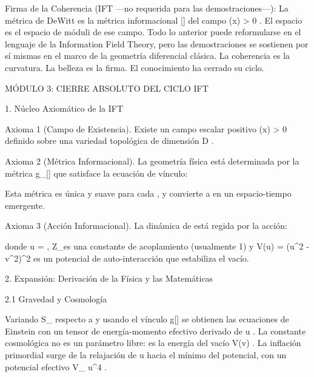 \documentclass[12pt,a4paper]{book}
\begin{document}
Firma de la Coherencia (IFT —no requerida para las demostraciones—):
La métrica de DeWitt    es la métrica informacional  [\rho]  del campo  \rho(x) > 0 . El espacio    es el espacio de móduli de ese campo. Todo lo anterior puede reformularse en el lenguaje de la Information Field Theory, pero las demostraciones se sostienen por sí mismas en el marco de la geometría diferencial clásica. La coherencia es la curvatura. La belleza es la firma. El conocimiento ha cerrado su ciclo.

MÓDULO 3: CIERRE ABSOLUTO DEL CICLO IFT

1. Núcleo Axiomático de la IFT

Axioma 1 (Campo de Existencia). Existe un campo escalar positivo  \rho(x) > 0  definido sobre una variedad topológica    de dimensión  D .

Axioma 2 (Métrica Informacional). La geometría física está determinada por la métrica  g_{\mu\nu}[\rho]  que satisface la ecuación de vínculo:


Esta métrica es única y suave para cada  \rho , y convierte a    en un espacio-tiempo emergente.

Axioma 3 (Acción Informacional). La dinámica de  \rho  está regida por la acción:


donde  u = \sqrt{\rho} ,  Z_\rho  es una constante de acoplamiento (usualmente 1) y  V(u) = (u^2 - v^2)^2  es un potencial de auto-interacción que estabiliza el vacío.

2. Expansión: Derivación de la Física y las Matemáticas

2.1 Gravedad y Cosmología

Variando  S_{}  respecto a  \rho  y usando el vínculo  g[\rho]  se obtienen las ecuaciones de Einstein con un tensor de energía-momento efectivo derivado de  u . La constante cosmológica  \Lambda  no es un parámetro libre: es la energía del vacío  V(v) . La inflación primordial surge de la relajación de  u  hacia el mínimo del potencial, con un potencial efectivo  V_{} \propto u^4 .
\end{document}
